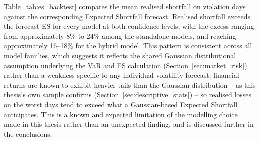 \documentclass[12pt,a4paper]{article}
\begin{document}
\begin{table}[H]
\centering
{}
\caption{Kupiec unconditional coverage test results across all models and confidence levels.}
\label{tab:kupiec_results}
\end{table}

Table~\ref{tab:es_backtest} compares the mean realised shortfall on violation days against the
corresponding Expected Shortfall forecast. Realised shortfall exceeds the forecast ES for every
model at both confidence levels, with the excess ranging from approximately 8\% to 24\% among the
standalone models, and reaching approximately 16--18\% for the hybrid model. This pattern is
consistent across all model families, which suggests it reflects the shared Gaussian distributional
assumption underlying the VaR and ES calculation (Section~\ref{sec:market_risk}) rather than a
weakness specific to any individual volatility forecast: financial returns are known to exhibit
heavier tails than the Gaussian distribution -- as this thesis's own sample confirms
(Section~\ref{sec:descriptive_stats}) -- so realised losses on the worst days tend to exceed what a
Gaussian-based Expected Shortfall anticipates. This is a known and expected limitation of the
modelling choice made in this thesis rather than an unexpected finding, and is discussed further in
the conclusions.
\end{document}
